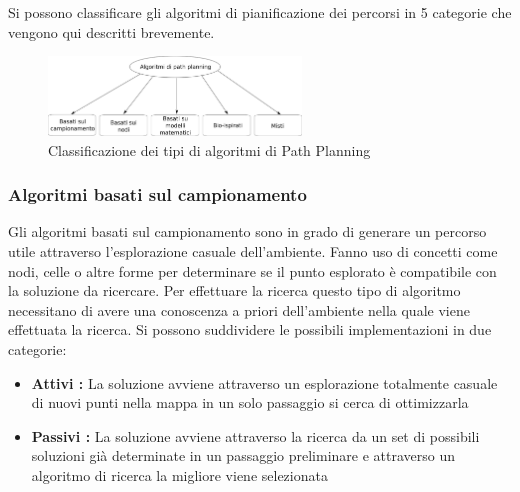 Si possono classificare gli algoritmi di pianificazione dei percorsi in 5 categorie che vengono qui descritti brevemente.

\begin{figure}
	\centering
	\includegraphics[width=0.6\textwidth]{SistemaQuadrirotore/Figure/Path}
	\caption{Classificazione dei tipi di algoritmi di Path Planning \cite{YangLiang2016SoR3}}
	\label{fig:categoriecontrolli}
\end{figure}


\subsubsection{Algoritmi basati sul campionamento}

Gli algoritmi basati sul campionamento sono in grado di generare un percorso utile attraverso l'esplorazione casuale dell'ambiente. Fanno uso di concetti come nodi, celle o altre forme per determinare se il punto esplorato è compatibile con la soluzione da ricercare. Per effettuare la ricerca questo tipo di algoritmo necessitano di avere una conoscenza a priori dell'ambiente nella quale viene effettuata la ricerca.
Si possono suddividere le possibili implementazioni in due categorie:
\begin{itemize}
	\item \textbf{Attivi : } La soluzione avviene attraverso un esplorazione totalmente casuale di nuovi punti nella mappa in un solo passaggio si cerca di ottimizzarla
	\item \textbf{Passivi : }  La soluzione avviene attraverso la ricerca da un set di possibili soluzioni già determinate in un passaggio preliminare e attraverso un algoritmo di ricerca la migliore viene selezionata
\end{itemize}





